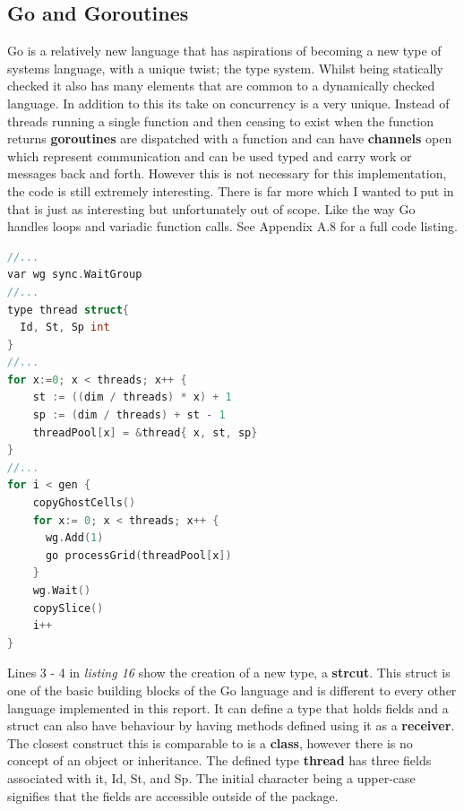 \documentclass[11pt]{article} %
\begin{document}
\subsection{Go and Goroutines}
Go is a relatively new language that has aspirations of becoming a new type of systems language, with a unique twist; the type system. Whilst being statically checked it also has many elements that are common to a dynamically checked language. In addition to this its take on concurrency is a very unique. Instead of threads running a single function and then ceasing to exist when the function returns {\bf goroutines} are dispatched with a function and can have {\bf channels} open which represent communication and can be used typed and carry work or messages back and forth. However this is not necessary for this implementation, the code is still extremely interesting. There is far more which I wanted to put in that is just as interesting but unfortunately out of scope. Like the way Go handles loops and variadic function calls. See Appendix A.8 for a full code listing.
\begin{lstlisting}[language=C, caption={Go and Goroutines, Game of Life Main Game Loop}]
//...
var wg sync.WaitGroup
//...
type thread struct{
  Id, St, Sp int
}
//...
for x:=0; x < threads; x++ {
    st := ((dim / threads) * x) + 1
    sp := (dim / threads) + st - 1
    threadPool[x] = &thread{ x, st, sp}
}
//...
for i < gen {
    copyGhostCells()
    for x:= 0; x < threads; x++ {
      wg.Add(1)
      go processGrid(threadPool[x])
    }
    wg.Wait()
    copySlice()
    i++
}  
\end{lstlisting}
Lines 3 - 4 in {\it listing 16} show the creation of a new type, a {\bf strcut}. This struct is one of the basic building blocks of the Go language and is different to every other language implemented in this report. It can define a type that holds fields and a struct can also have behaviour by having methods defined using it as a {\bf receiver}. The closest construct this is comparable to is a {\bf class}, however there is no concept of an object or inheritance. The defined type {\bf thread} has three fields associated with it, Id, St, and Sp. The initial character being a upper-case signifies that the fields are accessible outside of the package. 
\end{document}
